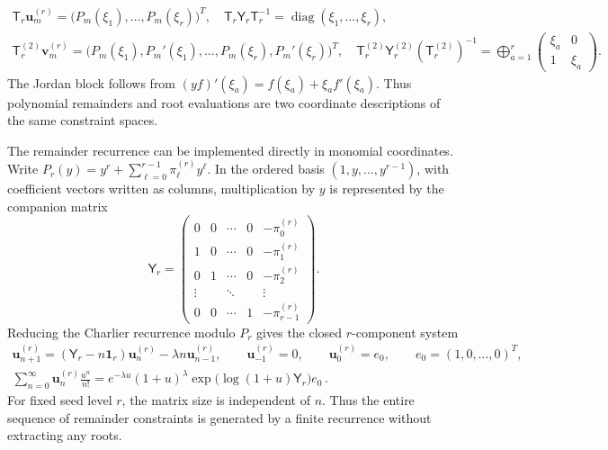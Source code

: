 \documentclass[a4paper,11pt]{article}
\def\ee{e}%
\theoremstyle{definition}
\theoremstyle{remark}
\newcommand{\ee}{\mathrm e}
\newcommand{\Id}{\mathbf 1}
\newcommand{\diag}{\operatorname{diag}}
\begin{document}
\begin{gather}
   \mathsf T_r\mathbf u_m^{(r)}
    =\bigl(P_m(\xi_1),\ldots,P_m(\xi_r)\bigr)^T, \quad
   \mathsf T_r\mathsf Y_r\mathsf T_r^{-1}
   =\diag(\xi_1,\ldots,\xi_r), \label{eq:H1-remainder-root-coordinate-map-app}\\
   \mathsf T_r^{(2)}\mathbf v_m^{(r)} 
   =\bigl(P_m(\xi_1),P_m'(\xi_1),\ldots,
   P_m(\xi_r),P_m'(\xi_r)\bigr)^T, \quad
   \mathsf T_r^{(2)}\mathsf Y_r^{(2)}
   (\mathsf T_r^{(2)})^{-1}
   =\bigoplus_{a=1}^{r}
   \begin{pmatrix}\xi_a&0\\1&\xi_a\end{pmatrix}. \nonumber
\end{gather}
The Jordan block follows from $(yf)'(\xi_a)=f(\xi_a)+\xi_af'(\xi_a)$. Thus polynomial remainders and root evaluations are two coordinate descriptions of the same constraint spaces.%

The remainder recurrence can be implemented directly in monomial coordinates. Write
$ 
   P_r(y)=y^r+\sum_{\ell=0}^{r-1}\pi_\ell^{(r)}y^\ell.
$ 
In the ordered basis $(1,y,\ldots,y^{r-1})$, with coefficient vectors written as columns, multiplication by $y$ is represented by the companion matrix
\begin{equation}
   \mathsf Y_r=
   \begin{pmatrix}
      0&0&\cdots&0&-\pi_0^{(r)}\\
      1&0&\cdots&0&-\pi_1^{(r)}\\
      0&1&\cdots&0&-\pi_2^{(r)}\\
      \vdots&&\ddots&&\vdots\\
      0&0&\cdots&1&-\pi_{r-1}^{(r)}
   \end{pmatrix}.
   \label{eq:H1-companion-matrix-app}
\end{equation}
Reducing the Charlier recurrence modulo $P_r$ gives the closed $r$-component system
\begin{gather}
   \mathbf u_{n+1}^{(r)}
   =(\mathsf Y_r-n\Id_r)\mathbf u_n^{(r)}
   -\lambda n\mathbf u_{n-1}^{(r)},
   \qquad
   \mathbf u_{-1}^{(r)}=0,\qquad
   \mathbf u_0^{(r)}=e_0,\qquad
   e_0=(1,0,\ldots,0)^T,\nonumber \\
   \sum_{n=0}^{\infty}\mathbf u_n^{(r)}\frac{u^n}{n!}
   =\ee^{-\lambda u}(1+u)^\lambda
   \exp\!\bigl(\log(1+u)\mathsf Y_r\bigr)e_0\,. \label{eq:H1-remainder-recurrence-EGF-app}
\end{gather}
For fixed seed level $r$, the matrix size is independent of $n$. Thus the entire sequence of remainder constraints is generated by a finite recurrence without extracting any roots.
\end{document}
